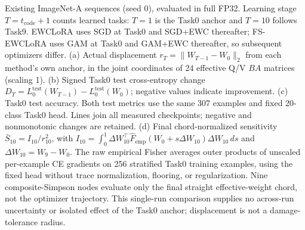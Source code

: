 \caption{Existing ImageNet-A sequences (seed 0), evaluated in full FP32. Learning stage $T=t_{\mathrm{code}}+1$ counts learned tasks: $T=1$ is the Task0 anchor and $T=10$ follows Task9. EWCLoRA uses SGD at Task0 and SGD+EWC thereafter; FS-EWCLoRA uses GAM at Task0 and GAM+EWC thereafter, so subsequent optimizers differ. (a) Actual displacement $r_T=\|W_{T-1}-W_0\|_2$ from each method's own anchor, in the joint coordinates of 24 effective Q/V $BA$ matrices (scaling 1). (b) Signed Task0 test cross-entropy change $D_T=L_0^{\mathrm{test}}(W_{T-1})-L_0^{\mathrm{test}}(W_0)$; negative values indicate improvement. (c) Task0 test accuracy. Both test metrics use the same 307 examples and fixed 20-class Task0 head. Lines join all measured checkpoints; negative and nonmonotonic changes are retained. (d) Final chord-normalized sensitivity $\bar S_{10}=I_{10}/r_{10}^2$, with $I_{10}=\int_0^1\Delta W_{10}^{\top}\widehat F_{\mathrm{emp}}(W_0+s\Delta W_{10})\Delta W_{10}\,ds$ and $\Delta W_{10}=W_9-W_0$. The raw empirical Fisher averages outer products of unscaled per-example CE gradients on 256 stratified Task0 training examples, using the fixed head without trace normalization, flooring, or regularization. Nine composite-Simpson nodes evaluate only the final straight effective-weight chord, not the optimizer trajectory. This single-run comparison supplies no across-run uncertainty or isolated effect of the Task0 anchor; displacement is not a damage-tolerance radius.}
\label{fig:sequence}
